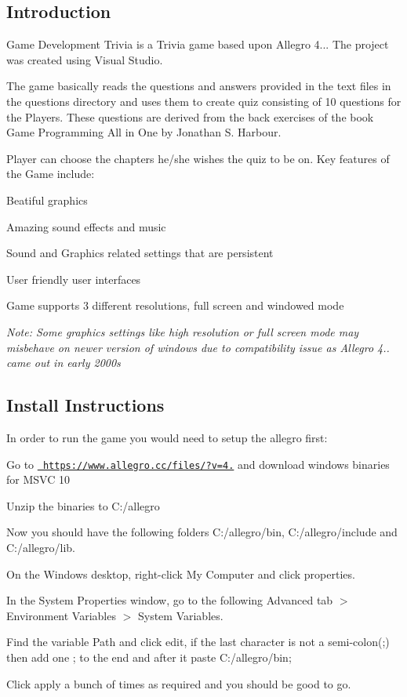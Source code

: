 \subsection*{Introduction}

Game Development Trivia is a Trivia game based upon Allegro 4... The project was created using Visual Studio.

The game basically reads the questions and answers provided in the text files in the questions directory and uses them to create quiz consisting of 10 questions for the Players. These questions are derived from the back exercises of the book Game Programming All in One by Jonathan S. Harbour.

Player can choose the chapters he/she wishes the quiz to be on. Key features of the Game include\+:
\begin{DoxyItemize}
\item Beatiful graphics
\item Amazing sound effects and music
\item Sound and Graphics related settings that are persistent
\item User friendly user interfaces
\item Game supports 3 different resolutions, full screen and windowed mode
\end{DoxyItemize}

{\itshape Note\+: Some graphics settings like high resolution or full screen mode may misbehave on newer version of windows due to compatibility issue as Allegro 4.. came out in early 2000s}

\subsection*{Install Instructions}

In order to run the game you would need to setup the allegro first\+:


\begin{DoxyEnumerate}
\item Go to \href{https://www.allegro.cc/files/?v=4.4}{\texttt{ https\+://www.\+allegro.\+cc/files/?v=4.}} and download windows binaries for M\+S\+VC 10
\item Unzip the binaries to C\+:/allegro
\item Now you should have the following folders C\+:/allegro/bin, C\+:/allegro/include and C\+:/allegro/lib.
\item On the Windows desktop, right-\/click My Computer and click properties.
\item In the System Properties window, go to the following Advanced tab $>$ Environment Variables $>$ System Variables.
\item Find the variable Path and click edit, if the last character is not a semi-\/colon(;) then add one ; to the end and after it paste C\+:/allegro/bin;
\item Click apply a bunch of times as required and you should be good to go.
\end{DoxyEnumerate}

